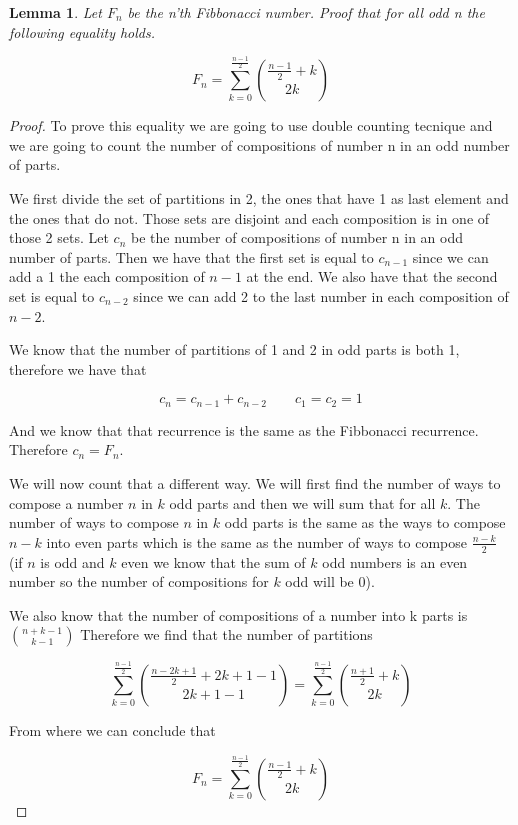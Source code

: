 \documentclass[12pt, a4papre]{article}
\author{Daniel Vilardell}
\title{}
\date{}
\newtheorem{lemma}{Lemma}
\begin{document}
	\maketitle
	\begin{lemma}
	Let $F_n$ be the n'th Fibbonacci number. Proof that for all odd n the following equality holds.
	
	\[
		F_n = \sum_{k=0}^{\frac{n-1}{2}} {\frac{n-1}{2}+k \choose 2k }
	\]
	\end{lemma}
	
	\begin{proof} To prove this equality we are going to use double counting tecnique and we are going to count the number of compositions of number n in an odd number of parts.
	
	We first divide the set of partitions in 2, the ones that have 1 as last element and the ones that do not. Those sets are disjoint and each composition is in one of those 2 sets. Let $c_n$ be the number of compositions of number n in an odd number of parts. Then we have that the first set is equal to $c_{n-1}$ since we can add a 1 the each composition of $n-1$ at the end. We also have that the second set is equal to $c_{n-2}$ since we can add 2 to the last number in each composition of $n-2$.
	
	We know that the number of partitions of 1 and 2 in odd parts is both 1, therefore we have that 
	
	\[
		c_n = c_{n-1} + c_{n-2} \qquad c_1 = c_2 = 1
	\]
	
	And we know that that recurrence is the same as the Fibbonacci recurrence. Therefore $c_n = F_n$.
	
	We will now count that a different way. We will first find the number of ways to compose a number $n$ in $k$ odd parts and then we will sum that for all $k$. The number of ways to compose $n$ in $k$ odd parts is the same as the ways to compose $n-k$ into even parts which is the same as the number of ways to compose $\frac{n-k}{2}$ (if $n$ is odd and $k$ even we know that the sum of $k$ odd numbers is an even number so the number of compositions for $k$ odd will be 0). 
	
	We also know that the number of compositions of a number into k parts is ${n+k-1\choose k-1}$ Therefore we find that the number of partitions 
	
	\[
		\sum_{k=0}^{\frac{n-1}{2}} {\frac{n-2k+1}{2} +2k+1-1\choose 2k +1-1} = \sum_{k=0}^{\frac{n-1}{2}} {\frac{n+1}{2} +k\choose 2k}
	\]
	
	From where we can conclude that 
	
	\[
		F_n = \sum_{k=0}^{\frac{n-1}{2}} {\frac{n-1}{2}+k \choose 2k }
	\]
	\end{proof}
\end{document}

